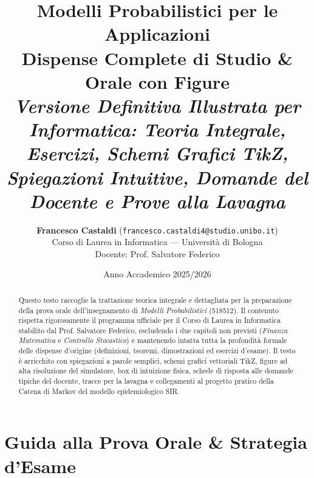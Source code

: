 \documentclass[11pt, a4paper]{report}
\theoremstyle{plain}
\theoremstyle{definition}
\theoremstyle{remark}
\newcommand{\1}{\mathbf{1}}
\begin{document}
\title{
  \Huge\textbf{Modelli Probabilistici per le Applicazioni}\\
  \vspace{0.4cm}
  \LARGE\textbf{Dispense Complete di Studio \& Orale con Figure}\\
  \vspace{0.2cm}
  \large\textit{Versione Definitiva Illustrata per Informatica: Teoria Integrale, Esercizi, Schemi Grafici TikZ, Spiegazioni Intuitive, Domande del Docente e Prove alla Lavagna}
}
\author{\textbf{Francesco Castaldi} (\texttt{francesco.castaldi4@studio.unibo.it})\\Corso di Laurea in Informatica — Università di Bologna\\Docente: Prof. Salvatore Federico}
\date{Anno Accademico 2025/2026}

\maketitle

\begin{abstract}
Questo testo raccoglie la trattazione teorica integrale e dettagliata per la preparazione della prova orale dell'insegnamento di \emph{Modelli Probabilistici} (518512). Il contenuto rispetta rigorosamente il programma ufficiale per il Corso di Laurea in Informatica stabilito dal Prof. Salvatore Federico, escludendo i due capitoli non previsti (\emph{Finanza Matematica} e \emph{Controllo Stocastico}) e mantenendo intatta tutta la profondità formale delle dispense d'origine (definizioni, teoremi, dimostrazioni ed esercizi d'esame). Il testo è arricchito con spiegazioni a parole semplici, schemi grafici vettoriali TikZ, figure ad alta risoluzione del simulatore, box di intuizione fisica, schede di risposta alle domande tipiche del docente, tracce per la lavagna e collegamenti al progetto pratico della Catena di Markov del modello epidemiologico SIR.
\end{abstract}

\tableofcontents
\newpage

\chapter*{Guida alla Prova Orale \& Strategia d'Esame}
\end{document}
